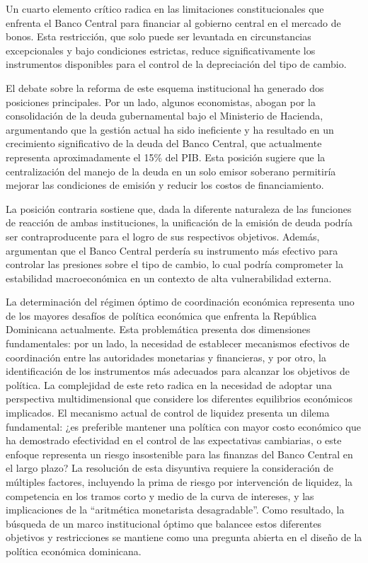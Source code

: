 \documentclass[
  authoryear,
  preprint]{elsarticle}
\begin{document}
Un cuarto elemento crítico radica en las limitaciones constitucionales
que enfrenta el Banco Central para financiar al gobierno central en el
mercado de bonos. Esta restricción, que solo puede ser levantada en
circunstancias excepcionales y bajo condiciones estrictas, reduce
significativamente los instrumentos disponibles para el control de la
depreciación del tipo de cambio.

El debate sobre la reforma de este esquema institucional ha generado dos
posiciones principales. Por un lado, algunos economistas, abogan por la
consolidación de la deuda gubernamental bajo el Ministerio de Hacienda,
argumentando que la gestión actual ha sido ineficiente y ha resultado en
un crecimiento significativo de la deuda del Banco Central, que
actualmente representa aproximadamente el 15\% del PIB. Esta posición
sugiere que la centralización del manejo de la deuda en un solo emisor
soberano permitiría mejorar las condiciones de emisión y reducir los
costos de financiamiento.

La posición contraria sostiene que, dada la diferente naturaleza de las
funciones de reacción de ambas instituciones, la unificación de la
emisión de deuda podría ser contraproducente para el logro de sus
respectivos objetivos. Además, argumentan que el Banco Central perdería
su instrumento más efectivo para controlar las presiones sobre el tipo
de cambio, lo cual podría comprometer la estabilidad macroeconómica en
un contexto de alta vulnerabilidad externa.

La determinación del régimen óptimo de coordinación económica representa
uno de los mayores desafíos de política económica que enfrenta la
República Dominicana actualmente. Esta problemática presenta dos
dimensiones fundamentales: por un lado, la necesidad de establecer
mecanismos efectivos de coordinación entre las autoridades monetarias y
financieras, y por otro, la identificación de los instrumentos más
adecuados para alcanzar los objetivos de política. La complejidad de
este reto radica en la necesidad de adoptar una perspectiva
multidimensional que considere los diferentes equilibrios económicos
implicados. El mecanismo actual de control de liquidez presenta un
dilema fundamental: ¿es preferible mantener una política con mayor costo
económico que ha demostrado efectividad en el control de las
expectativas cambiarias, o este enfoque representa un riesgo
insostenible para las finanzas del Banco Central en el largo plazo? La
resolución de esta disyuntiva requiere la consideración de múltiples
factores, incluyendo la prima de riesgo por intervención de liquidez, la
competencia en los tramos corto y medio de la curva de intereses, y las
implicaciones de la ``aritmética monetarista desagradable''. Como
resultado, la búsqueda de un marco institucional óptimo que balancee
estos diferentes objetivos y restricciones se mantiene como una pregunta
abierta en el diseño de la política económica dominicana.
\end{document}
